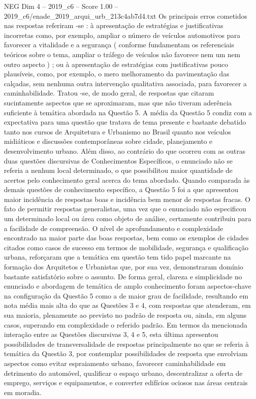 \begin{textsample}{NEG Dim 4 – 2019\_c6 – Score 1.00 – 2019\_c6/enade\_2019\_arqui\_urb\_213c4ab7d4.txt}
Os principais erros cometidos nas respostas referiram -se : à apresentação de estratégias e justificativas incorretas como, por exemplo, ampliar o número de veículos automotivos para favorecer a vitalidade e a segurança ( conforme fundamentam os referenciais teóricos sobre o tema, ampliar o tráfego de veículos não favorece nem um nem outro aspecto ) ; ou à apresentação de estratégias com justificativas pouco plausíveis, como, por exemplo, o mero melhoramento da pavimentação das calçadas, sem nenhuma outra intervenção qualitativa associada, para favorecer a caminhabilidade.
Tratou -se, de modo geral, de respostas que citaram sucintamente aspectos que se aproximaram, mas que não tiveram aderência suficiente à temática abordada na Questão 5.
A média da Questão 5 condiz com a expectativa para uma questão que tratava de tema presente e bastante debatido tanto nos cursos de Arquitetura e Urbanismo no Brasil quanto nos veículos midiáticos e discussões contemporâneas sobre cidade, planejamento e desenvolvimento urbano.
Além disso, ao contrário do que ocorreu com as outras duas questões discursivas de Conhecimentos Específicos, o enunciado não se referia a nenhum local determinado, o que possibilitou maior quantidade de acertos pelo conhecimento geral acerca do tema abordado.
Quando comparada às demais questões de conhecimento específico, a Questão 5 foi a que apresentou maior incidência de respostas boas e incidência bem menor de respostas fracas.
O fato de permitir respostas generalistas, uma vez que o enunciado não especificou um determinado local ou área como objeto de análise, certamente contribuiu para a facilidade de compreensão.
O nível de aprofundamento e complexidade encontrado na maior parte das boas respostas, bem como os exemplos de cidades citados como casos de sucesso em termos de mobilidade, segurança e qualificação urbana, reforçaram que a temática em questão tem tido papel marcante na formação dos Arquitetos e Urbanistas que, por sua vez, demonstraram domínio bastante satisfatório sobre o assunto.
De forma geral, clareza e simplicidade no enunciado e abordagem de temática de amplo conhecimento foram aspectos-chave na configuração da Questão 5 como a de maior grau de facilidade, resultando em nota média mais alta do que as Questões 3 e 4, com respostas que atenderam, em sua maioria, plenamente ao previsto no padrão de resposta ou, ainda, em alguns casos, superando em complexidade o referido padrão.
Em termos da mencionada interação entre as Questões discursivas 3, 4 e 5, esta última apresentou possibilidades de transversalidade de respostas principalmente no que se referia à temática da Questão 3, por contemplar possibilidades de resposta que envolviam aspectos como evitar espraiamento urbano, favorecer caminhabilidade em detrimento do automóvel, qualificar o espaço urbano, descentralizar a oferta de emprego, serviços e equipamentos, e converter edifícios ociosos nas áreas centrais em moradia.

\end{textsample}

